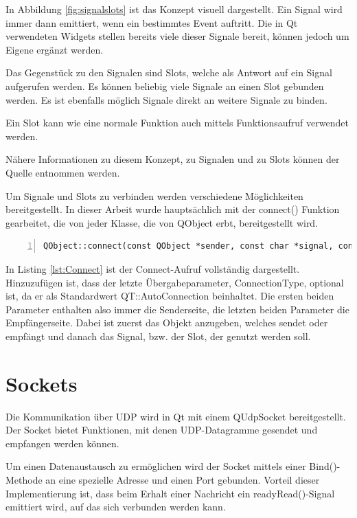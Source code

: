In Abbildung \ref{fig:signalslots} ist das Konzept visuell dargestellt. Ein Signal wird immer dann emittiert, wenn ein bestimmtes Event auftritt. Die in Qt verwendeten Widgets stellen bereits viele dieser Signale bereit, können jedoch um Eigene ergänzt werden. 

Das Gegenstück zu den Signalen sind Slots, welche als Antwort auf ein Signal aufgerufen werden. Es können beliebig viele Signale an einen Slot gebunden werden. Es ist ebenfalls möglich Signale direkt an weitere Signale zu binden. 

Ein Slot kann wie eine normale Funktion auch mittels Funktionsaufruf verwendet werden.  

Nähere Informationen zu diesem Konzept, zu Signalen und zu Slots können der Quelle \cite{qt_signalslot} entnommen werden. 

Um Signale und Slots zu verbinden werden verschiedene Möglichkeiten bereitgestellt. In dieser Arbeit wurde hauptsächlich mit der connect() Funktion gearbeitet, die von jeder Klasse, die von QObject erbt, bereitgestellt wird. 

\begin{lstlisting}[frame=single, breaklines=true, numbers=left, stepnumber=2, firstnumber=1, numberstyle = \tiny, caption=Connect Signals and Slots ,label=lst:Connect]
QObject::connect(const QObject *sender, const char *signal, const QObject *receiver, const char *method, Qt::ConnectionType type = Qt::AutoConnection)
\end{lstlisting}

In Listing \ref{lst:Connect} ist der Connect-Aufruf vollständig dargestellt. Hinzuzufügen ist, dass der letzte Übergabeparameter, ConnectionType, optional ist, da er als Standardwert QT::AutoConnection beinhaltet. Die ersten beiden Parameter enthalten also immer die Senderseite, die letzten beiden Parameter die Empfängerseite. Dabei ist zuerst das Objekt anzugeben, welches sendet oder empfängt und danach das Signal, bzw. der Slot, der genutzt werden soll. 

\section{Sockets}
\label{sec:QTSocket}

Die Kommunikation über UDP wird in Qt mit einem QUdpSocket bereitgestellt. Der Socket bietet Funktionen, mit denen UDP-Datagramme gesendet und empfangen werden können. 

Um einen Datenaustausch zu ermöglichen wird der Socket mittels einer Bind()-Methode an eine spezielle Adresse und einen Port gebunden. Vorteil dieser Implementierung ist, dass beim Erhalt einer Nachricht ein readyRead()-Signal emittiert wird, auf das sich verbunden werden kann. 

